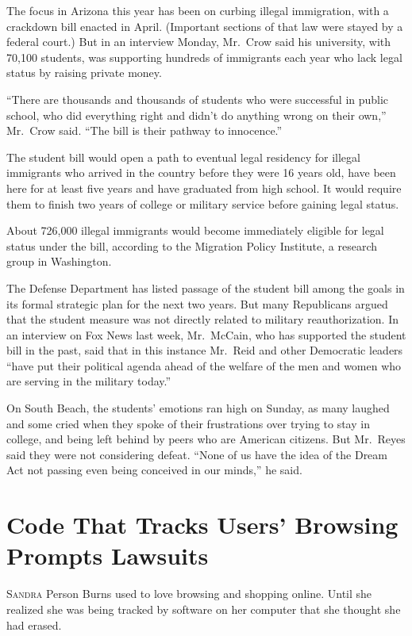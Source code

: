 ﻿\documentclass[12pt]{article}
\begin{document}
The focus in Arizona this year has been on curbing illegal immigration, with a crackdown bill
enacted in April. (Important sections of that law were stayed by a federal court.) But in an
interview Monday, Mr.~Crow said his university, with 70,100 students, was supporting hundreds of
immigrants each year who lack legal status by raising private money.

``There are thousands and thousands of students who were successful in public school, who did
everything right and didn't do anything wrong on their own,'' Mr.~Crow said. ``The bill is their
pathway to innocence.''

The student bill would open a path to eventual legal residency for illegal immigrants who arrived in
the country before they were 16 years old, have been here for at least five years and have graduated
from high school. It would require them to finish two years of college or military service before
gaining legal status.

About 726,000 illegal immigrants would become immediately eligible for legal status under the bill,
according to the Migration Policy Institute, a research group in Washington.

The Defense Department has listed passage of the student bill among the goals in its formal
strategic plan for the next two years. But many Republicans argued that the student measure was not
directly related to military reauthorization. In an interview on Fox News last week, Mr.~McCain, who
has supported the student bill in the past, said that in this instance Mr.~Reid and other Democratic
leaders ``have put their political agenda ahead of the welfare of the men and women who are serving
in the military today.''

On South Beach, the students' emotions ran high on Sunday, as many laughed and some cried when they
spoke of their frustrations over trying to stay in college, and being left behind by peers who are
American citizens. But Mr.~Reyes said they were not considering defeat. ``None of us have the idea
of the Dream Act not passing even being conceived in our minds,'' he said.

\pagebreak
\section{Code That Tracks Users' Browsing Prompts Lawsuits}

\lettrine{S}{andra} Person Burns used to love browsing and shopping online.
Until she realized she was being tracked by software on her computer that she thought she had
erased.
\end{document}
